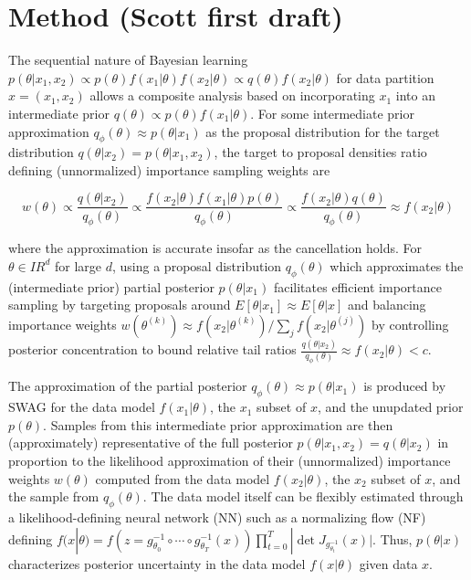 \documentclass[11pt, oneside]{article}   	%
\begin{document}
\section{Method (Scott first draft)}

The sequential nature of Bayesian learning $p(\theta | x_1,x_2) \propto p(\theta)f(x_1|\theta) f(x_2|\theta) \propto q(\theta) f(x_2|\theta)$ for data partition $x=(x_1,x_2)$ allows a composite analysis based on incorporating $x_1$ into an intermediate prior $q(\theta) \propto p(\theta) f(x_1 | \theta )$. 
For some intermediate prior approximation $q_\phi(\theta) \approx p(\theta |x_1)$ as the proposal distribution for the target distribution $q(\theta|x_2) = p(\theta | x_1,x_2)$, the target to proposal densities ratio defining (unnormalized) importance sampling weights \cite{BayesIS} are

$$w(\theta) \propto \frac{q(\theta|x_2)}{q_\phi(\theta)} \propto \frac{f(x_2| \theta) f(x_1| \theta) p(\theta) }{q_\phi(\theta)}  \propto \frac{f(x_2| \theta) q(\theta) }{q_\phi(\theta)}  \approx  f(x_2| \theta)$$

\noindent where the approximation is accurate insofar as the cancellation holds.  For $\theta \in I \!\! R^d$ for large $d$, using a proposal distribution $q_\phi(\theta)$ which approximates the (intermediate prior) partial posterior $p(\theta |x_1)$ facilitates efficient importance sampling by targeting proposals around $E[\theta | x_1] \approx E[\theta | x]$ and balancing importance weights 
$w(\theta^{(k)})  \approx  f(x_2| \theta^{(k)}) /  \sum_j f(x_2| \theta^{(j)})$ 
by controlling posterior concentration to bound relative tail ratios $\frac{q(\theta|  x_2)}{q_\phi(\theta)} \approx f(x_2| \theta )< c$.

The approximation of the partial posterior $q_\phi(\theta) \approx p(\theta |x_1)$ is produced by SWAG \cite{SWAG19} for the data model $f(x_1| \theta)$, the $x_1$ subset of $x$, and the unupdated prior $p(\theta)$. Samples from this intermediate prior approximation are then (approximately) representative of the full posterior $p(\theta | x_1,x_2) = q(\theta | x_2)$ in proportion to the likelihood approximation of their (unnormalized) importance weights $w(\theta)$ computed from the data model $f(x_2| \theta)$,  the $x_2$ subset of $x$, and the sample from $q_\phi(\theta)$.  The data model itself can be flexibly estimated through a likelihood-defining neural network (NN) such as a normalizing flow (NF) \cite{NFreview} defining $f(x|\theta) = f(z=g^{-1}_{\theta_0}\circ \cdots \circ g^{-1}_{\theta_T}(x)) \prod_{t=0}^T | \det J_{g^{-1}_{\theta_t}}(x) |$. Thus, $p(\theta | x)$ characterizes posterior uncertainty in the data model $f(x|\theta)$ given data $x$.
\end{document}
